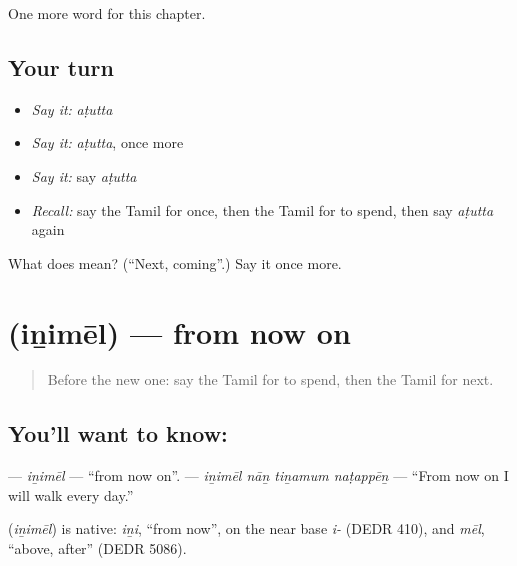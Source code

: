 \begin{grammarlens}[title={What you've built}]
One more word for this chapter.
\end{grammarlens}

\subsection*{Your turn}
\begin{itemize}
\raggedright
  \item \emph{Say it:} \emph{aṭutta}
  \item \emph{Say it:} \emph{aṭutta}, once more
  \item \emph{Say it:} say \emph{aṭutta}
  \item \emph{Recall:} say the Tamil for once, then the Tamil for to spend, then say \emph{aṭutta} again
\end{itemize}

\begin{tcolorbox}[breakable,colback=teal!4,colframe=teal!35!black,title={Before you move on}]
What does  mean? (\textquotedblleft{}Next, coming\textquotedblright{}.) Say it once more.
\end{tcolorbox}
\section[\texorpdfstring{\ta{இனிமேல்} (iṉimēl)}{இனிமேல் (iṉimēl)}]{ (iṉimēl) — from now on}

\label{lesson:TA-C159-inimel}



\begin{quote}
Before the new one: say the Tamil for to spend, then the Tamil for next.
\end{quote}

\subsection*{You'll want to know: }
\textbf{} — \emph{iṉimēl} — \textquotedblleft{}from now on\textquotedblright{}. \textbf{   } — \emph{iṉimēl nāṉ tiṉamum naṭappēṉ} — \textquotedblleft{}From now on I will walk every day.\textquotedblright{}

\begin{cousinweb}
\textbf{} (\emph{iṉimēl}) is native: \emph{iṉi}, \textquotedblleft{}from now\textquotedblright{}, on the near base \emph{i-} (DEDR 410), and \emph{mēl}, \textquotedblleft{}above, after\textquotedblright{} (DEDR 5086).
\end{cousinweb}

